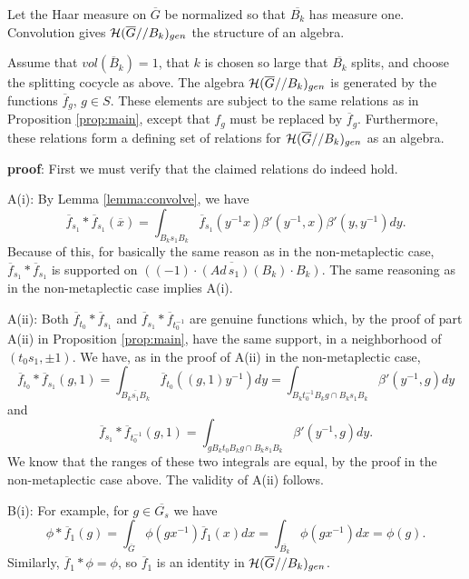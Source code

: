 Let the Haar measure on $\overline{G}$ be normalized so that
$\overline{B_k}$ has measure one.
Convolution gives ${\cal H}(\overline{G}//B_k)_{gen}$ the structure of an
algebra. 

\begin{proposition} 
\label{prop:main2}
Assume that $vol(\overline{B}_k)=1$,
that $k$ is chosen so large that $\overline{B_k}$ splits,
and choose the splitting cocycle as above.
The algebra ${\cal H}(\overline{G}//B_k)_{gen}$
is generated by the functions $\overline{f}_g$, $g\in S$.
These elements are subject to the same relations 
as in Proposition \ref{prop:main}, except that $f_g$ must be
replaced by $\overline{f}_g$.
Furthermore, these relations form a defining set of relations for
${\cal H}(\overline{G}//B_k)_{gen}$ as an algebra.
\end{proposition}

{\bf proof}: First we must verify that the claimed relations do 
indeed hold.

A(i): By Lemma \ref{lemma:convolve}, we have
\[
\overline{f}_{s_1}*\overline{f}_{s_1}(\overline{x})
=\int_{B_ks_1B_k}
\overline{f}_{s_1}(y^{-1}x)\beta'(y^{-1},x)\beta'(y,y^{-1})dy.
\]
Because of this, for basically 
the same reason as in the non-metaplectic case, 
$\overline{f}_{s_1}*\overline{f}_{s_1}$
is supported on $\overline{((-1)\cdot (Ad\, s_1)(B_k)\cdot B_k)}$.
The same reasoning as in the non-metaplectic case
implies A(i).

A(ii): Both $\overline{f}_{t_0}*\overline{f}_{s_1}$ and 
$\overline{f}_{s_1}*\overline{f}_{t_0^{-1}}$ are genuine functions which,
by the proof of part A(ii) in Proposition \ref{prop:main},
have the same support, in a neighborhood
of $(t_0s_1,\pm 1)$. We have, as in the proof of
A(ii) in the non-metaplectic case,
\[
\overline{f}_{t_0}*\overline{f}_{s_1}(g,1)
=\int_{\overline{B_ks_1B_k}}
\overline{f}_{t_0}((g,1)y^{-1})dy
=\int_{B_kt_0^{-1}B_kg\cap B_ks_1B_k} 
\beta'(y^{-1},g)dy
\]
and
\[
\overline{f}_{s_1}*\overline{f}_{t_0^{-1}}(g,1)
=\int_{gB_kt_0B_kg\cap B_ks_1B_k} \beta'(y^{-1},g)dy.
\]
We know that the ranges of these two integrals are 
equal,
by the proof in the non-metaplectic case above.
The validity of A(ii) follows.

B(i): For example, for $g\in \overline{G_s}$ we have
\[
\phi*\overline{f}_1(g)=\int_{\overline{G}}\phi(gx^{-1})\overline{f}_1(x)dx
=\int_{\overline{B_k}}\phi(gx^{-1})dx
=\phi(g).
\]
Similarly, $\overline{f}_1*\phi=\phi$, so $\overline{f}_1$ is an 
identity in ${\cal H}(\overline{G}//B_k)_{gen}$.

